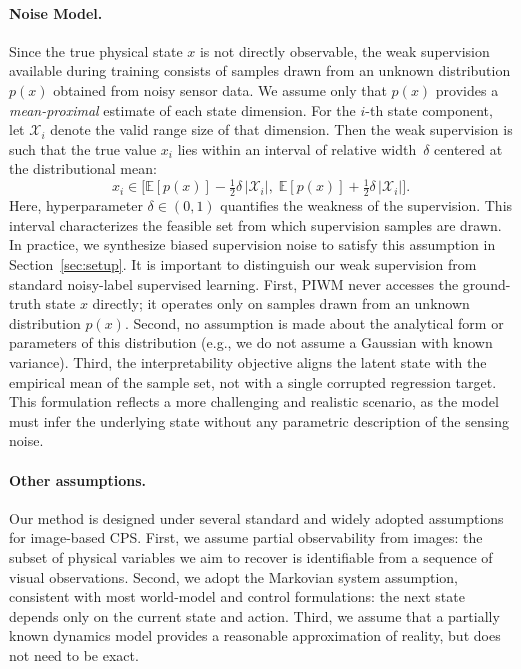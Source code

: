 \documentclass[nonacm,sigconf]{acmart}
\begin{document}
\paragraph{Noise Model.}
Since the true physical state $x$ is not directly observable, the weak
supervision available during training consists of samples drawn from an
unknown distribution $p(x)$ obtained from noisy sensor data.
We assume only that $p(x)$ provides a \emph{mean-proximal} estimate of each
state dimension. 
For the $i$-th state component, let $\mathcal{X}_i$ denote the valid 
range size of that dimension. Then the weak supervision is such that the true value $x_i$ lies within an 
interval of relative width~$\delta$ centered at the distributional mean:
\[
x_i \in 
\Big[
\mathbb{E}[p(x)] - \tfrac{1}{2}\delta\,|\mathcal{X}_i|,\;
\mathbb{E}[p(x)] + \tfrac{1}{2}\delta\,|\mathcal{X}_i|
\Big].
\]
Here, hyperparameter $\delta\in(0,1)$ quantifies the weakness of the supervision.  
This interval characterizes the feasible set from which supervision 
samples are drawn. In practice, we synthesize biased supervision noise to satisfy this assumption in Section~\ref{sec:setup}. It is important to distinguish our weak supervision from standard noisy-label supervised learning. First, PIWM never accesses the ground-truth state $x$ directly; it operates only on samples drawn from an unknown distribution $p(x)$. Second, no assumption is made about the analytical form or parameters of this distribution (e.g., we do not assume a Gaussian with known variance). Third, the interpretability objective aligns the latent state with the empirical mean of the sample set, not with a single corrupted regression target. This formulation reflects a more challenging and realistic scenario, as the model must infer the underlying state without any parametric description of the sensing noise.



\paragraph{Other assumptions.} 
Our method is designed under several standard and widely adopted assumptions for image-based CPS. First, we assume partial observability from images: the subset of physical variables we aim to recover is identifiable from a sequence of visual observations. Second, we adopt the Markovian system assumption, consistent with most world-model and control formulations: the next state depends only on the current state and action. Third, we assume that a partially known dynamics model provides a reasonable approximation of reality, but does not need to be exact.
\end{document}
